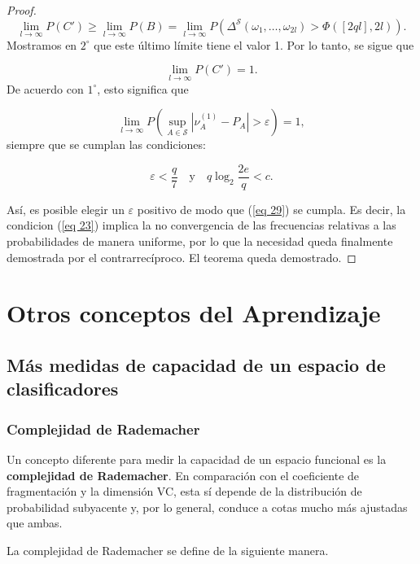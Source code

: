\documentclass{report}
\begin{document}
\begin{proof}
\[
\lim_{l \to \infty} P(C') \geq \lim_{l \to \infty} P(B) = \lim_{l \to \infty} P(\Delta^{\mathcal{S}}(\omega_1, \dots, \omega_{2l}) > \Phi([2q l],2l)).
\]
Mostramos en \( 2^\circ \) que este último límite tiene el valor 1. Por lo tanto, se sigue que 

\[
\lim_{l \to \infty} P(C') = 1.
\]
De acuerdo con \( 1^\circ \), esto significa que 

\begin{equation}\label{eq 29}
\lim_{l \to \infty} P\left( \sup_{A \in \mathcal{S}} \left| \nu_A^{(1)} - P_A \right| > \varepsilon \right) = 1,
\end{equation}
siempre que se cumplan las condiciones:

\[
\varepsilon < \frac{q}{7} \quad \text{y} \quad q \log_2 \frac{2e}{q} < c.
\]\newline

Así, es posible elegir un \( \varepsilon \) positivo de modo que (\ref{eq 29}) se cumpla. Es decir,
la condicion (\ref{eq 23}) implica la no convergencia de las frecuencias relativas a las probabilidades de manera uniforme,
por lo que la necesidad queda finalmente demostrada por el contrarrecíproco. El teorema queda demostrado.

\end{proof}
    




\chapter{Otros conceptos del Aprendizaje}

\section{Más medidas de capacidad de un espacio de clasificadores}
\subsection{Complejidad de Rademacher}
Un concepto diferente para medir la capacidad de un espacio funcional es la \textbf{complejidad de Rademacher}. 
En comparación con el coeficiente de fragmentación y la dimensión VC, esta sí depende de la distribución de 
probabilidad subyacente y, por lo general, conduce a cotas mucho más ajustadas que ambas.\newline

La complejidad de Rademacher se define de la siguiente manera.\newline
\end{document}
